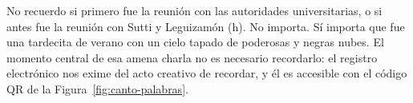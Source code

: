 No recuerdo si primero fue la reunión con las autoridades universitarias, o si antes fue la reunión con Sutti y Leguizamón (h). No importa. Sí importa que fue una tardecita de verano con un cielo tapado de poderosas y negras nubes. El momento central de esa amena charla no es necesario recordarlo: el registro electrónico nos exime del acto creativo de recordar, y él es accesible con el código QR de la Figura~\ref{fig:canto-palabras}.
